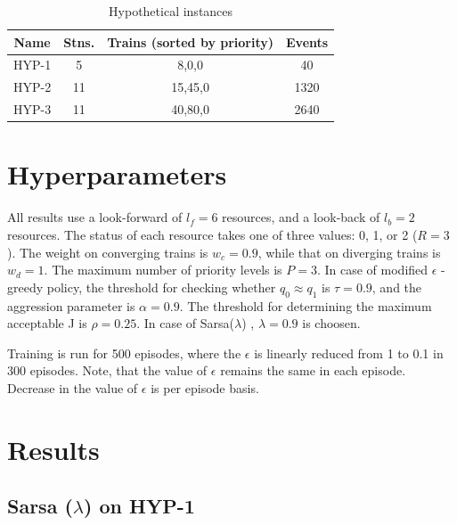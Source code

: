 \begin{table}[H]
    \centering
    \caption{Hypothetical instances}
    \label{Dataset}
    \begin{tabular}{ c c c c  } 
     \hline
     \textbf{Name} & \textbf{Stns.} & \textbf{Trains (sorted by priority)} & \textbf{Events} \\ 
     \hline
     \hline
     HYP-1 & 5 & 8,0,0 & 40 \\
    
     HYP-2 & 11 & 15,45,0 & 1320 \\
     
     HYP-3 & 11 & 40,80,0 & 2640 \\ 
     \hline
    \end{tabular}
\end{table}

\section{Hyperparameters}
All results use a look-forward of $l_f = 6$ resources, and a
look-back of $l_b = 2$ resources. The status of each resource
takes one of three values: 0, 1, or 2 ($R = 3$). The weight on
converging trains is $w_c = 0.9$, while that on diverging trains
is $w_d = 1$. The maximum number of priority levels is $P = 3$.
In case of modified $\epsilon$ - greedy policy, the threshold for checking whether $q_0 \approx q_1$ 
is $\tau = 0.9$, and the aggression parameter is $\alpha = 0.9$. The
threshold for determining the maximum acceptable J is
$\rho = 0.25$. In case of Sarsa($\lambda$) , $\lambda = 0.9$ is choosen.

\vspace{\baselineskip}
Training is run for 500 episodes, where the $\epsilon$ is linearly reduced from 1 to 0.1 in 300 
episodes. Note, that the value of $\epsilon$ remains the same in each episode. Decrease in the value of 
$\epsilon$ is per episode basis.

\section {Results}
\subsection{Sarsa ($\lambda$) on HYP-1}

